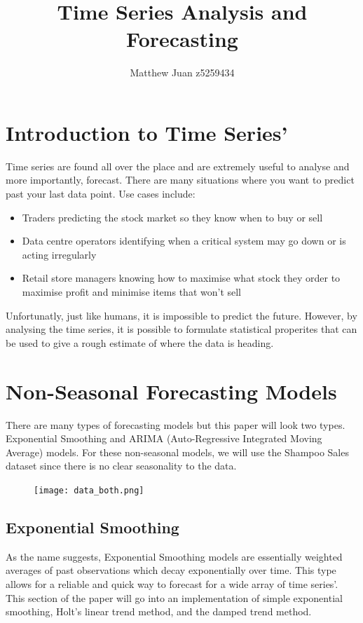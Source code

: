 \documentclass{article}
\title{Time Series Analysis and Forecasting}
\author{Matthew Juan z5259434}
\date{}
\begin{document}
  \maketitle
  \newpage
  \doublespacing
  \tableofcontents
  \singlespacing
  \newpage
  \section{Introduction to Time Series'}
  Time series are found all over the place and are extremely useful
  to analyse and more importantly, forecast. There are many situations where
  you want to predict past your last data point.
  Use cases include:
  \begin{itemize}
    \item Traders predicting the stock market so they know when to buy or sell
    \item Data centre operators identifying when a critical system may go down or is acting irregularly
    \item Retail store managers knowing how to maximise what stock they order to maximise profit and minimise items that won't sell
  \end{itemize}
  Unfortunatly, just like humans, it is impossible to predict the future.
  However, by analysing the time series, it is possible to formulate
  statistical properites that can be used to give a rough estimate of
  where the data is heading.
  
  \newpage
  
  \section{Non-Seasonal Forecasting Models}
    There are many types of forecasting models but this paper will look two types. Exponential Smoothing and ARIMA (Auto-Regressive Integrated Moving Average) models. For these non-seasonal models, we will use the Shampoo Sales dataset since there is no clear seasonality to the data.
    \begin{figure}[H]
      \texttt{[image: data\_both.png]}
    \end{figure}

  \subsection{Exponential Smoothing}
    As the name suggests, Exponential Smoothing models are essentially weighted averages of past observations which decay exponentially over time. This type allows for a reliable and quick way to forecast for a wide array of time series'. This section of the paper will go into an implementation of simple exponential smoothing, Holt's linear trend method, and the damped trend method.
  
\end{document}
